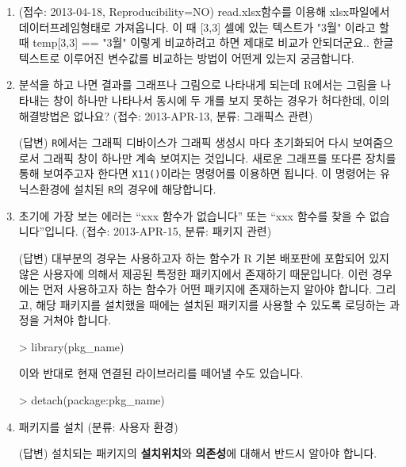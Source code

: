 \documentclass{article}
\begin{document}
\begin{enumerate}
	\item (접수: 2013-04-18, Reproducibility=NO) read.xlsx함수를 이용해 xlsx파일에서 데이터프레임형태로 가져옵니다. 이 때 [3,3] 셀에 있는 텍스트가 "3월" 이라고 할 때 temp[3,3] == "3월" 이렇게 비교하려고 하면 제대로 비교가 안되더군요.. 한글 텍스트로 이루어진 변수값를 비교하는 방법이 어떤게 있는지 궁금합니다.
	
	\item 분석을 하고 나면 결과를 그래프나 그림으로 나타내게 되는데 R에서는 그림을 나타내는 창이 하나만 나타나서 동시에 두 개를 보지 못하는 경우가 허다한데, 이의 해결방법은 없나요? (접수: 2013-APR-13, 분류: 그래픽스 관련) 
	
	\textsf{(답변)} \texttt{R}에서는 그래픽 디바이스가 그래픽 생성시 마다 초기화되어 다시 보여줌으로서 그래픽 창이 하나만 계속 보여지는 것입니다.  새로운 그래프를 또다른 장치를 통해 보여주고자 한다면 \texttt{X11()}이라는 명령어를 이용하면 됩니다.  
	이 명령어는 유닉스환경에 설치된 \texttt{R}의 경우에 해당합니다.  
	
	\item 초기에 가장 보는 에러는 ``xxx 함수가 없습니다'' 또는 ``xxx 함수를 찾을 수 없습니다''입니다. (접수: 2013-APR-15, 분류: 패키지 관련) 
	
	\textsf{(답변)} 대부분의 경우는 사용하고자 하는 함수가 R 기본 배포판에 포함되어 있지 않은 사용자에 의해서 제공된 특정한 패키지에서 존재하기 때문입니다.  	이런 경우에는 먼저 사용하고자 하는 함수가 어떤 패키지에 존재하는지 알아야 합니다.  그리고, 해당 패키지를 설치했을 때에는 설치된 패키지를 사용할 수 있도록 로딩하는 과정을 거쳐야 합니다.

	\begin{Schunk}
	\begin{Soutput}
	> library(pkg_name)	
	\end{Soutput}
	\end{Schunk}
	
	이와 반대로 현재 연결된 라이브러리를 떼어낼 수도 있습니다. 

	\begin{Schunk}
	\begin{Soutput}
	> detach(package:pkg_name)	
	\end{Soutput}
	\end{Schunk}


	\item 패키지를 설치 (분류: 사용자 환경)  
	
	\textsf{(답변)} 설치되는 패키지의 \textbf{설치위치}와 \textbf{의존성}에 대해서 반드시 알아야 합니다. 
	

\end{enumerate}
\end{document}
